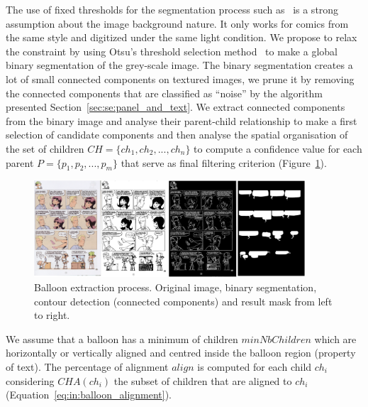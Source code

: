 The use of fixed thresholds for the segmentation process such as~\cite{Arai11} is a strong assumption about the image background nature.
It only works for comics from the same style and digitized under the same light condition.
We propose to relax the constraint by using Otsu's threshold selection method~\cite{otsu79} to make a global binary segmentation of the grey-scale image.
The binary segmentation creates a lot of small connected components on textured images, we prune it by removing the connected components that are classified as ``noise'' by the algorithm presented Section~\ref{sec:se:panel_and_text}.
We extract connected components from the binary image and analyse their parent-child relationship to make a first selection of candidate components and then analyse the spatial organisation of the set of children $CH=\{ch_1, ch_2,...,ch_n\}$ to compute a confidence value for each parent $P=\{p_1, p_2,...,p_m\}$ that serve as final filtering criterion (Figure~\ref{fig:in:balloon_binarisation}).

 \begin{figure}[!ht]  %
   \centering
  \includegraphics[width=0.9\textwidth]{closed_balloon_process.png}
  \caption[Balloon extraction process]{Balloon extraction process. Original image, binary segmentation, contour detection (connected components) and result mask from left to right.}
  \label{fig:in:balloon_binarisation}
 \end{figure}

We assume that a balloon has a minimum of children $minNbChildren$ which are horizontally or vertically aligned and centred inside the balloon region (property of text).
The percentage of alignment $align$ is computed for each child $ch_i$ considering $CHA(ch_i)$ the subset of children that are aligned to $ch_i$ (Equation~\ref{eq:in:balloon_alignment}).

